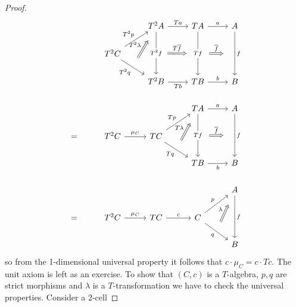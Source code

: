 \documentclass[a4paper,11pt,oneside,openany]{scrbook}
\begin{document}
\begin{proof}
    \[\begin{tikzcd}
        && {T^2A} & TA & A \\
        & {T^2C} \\
        && {T^2B} & TB & B \\
        &&& TA & A \\
        {=} & {T^2C} & TC \\
        &&& TB & B \\
        &&&& A \\
        {=} & {T^2C} & TC & C \\
        &&&& B
        \arrow[""{name=0, anchor=center, inner sep=0}, "{T^2q}"', from=2-2, to=3-3]
        \arrow["a", from=1-4, to=1-5]
        \arrow[""{name=1, anchor=center, inner sep=0}, "f", from=1-5, to=3-5]
        \arrow["Tb"', from=3-3, to=3-4]
        \arrow[""{name=2, anchor=center, inner sep=0}, "Tf"{description}, from=1-4, to=3-4]
        \arrow["b", from=3-4, to=3-5]
        \arrow[""{name=3, anchor=center, inner sep=0}, "{T^2f}"{description}, from=1-3, to=3-3]
        \arrow["Ta", from=1-3, to=1-4]
        \arrow["{T^2p}", from=2-2, to=1-3]
        \arrow[""{name=4, anchor=center, inner sep=0}, "f", from=4-5, to=6-5]
        \arrow["a", from=4-4, to=4-5]
        \arrow["b"', from=6-4, to=6-5]
        \arrow[""{name=5, anchor=center, inner sep=0}, "Tq"', from=5-3, to=6-4]
        \arrow["Tp", from=5-3, to=4-4]
        \arrow[""{name=6, anchor=center, inner sep=0}, "Tf"{description}, from=4-4, to=6-4]
        \arrow["{\mu_C}", from=5-2, to=5-3]
        \arrow["f", from=7-5, to=9-5]
        \arrow[""{name=7, anchor=center, inner sep=0}, "q"', from=8-4, to=9-5]
        \arrow["p", from=8-4, to=7-5]
        \arrow["c", from=8-3, to=8-4]
        \arrow["{\mu_C}", from=8-2, to=8-3]
        \arrow["{\overline{f}}", shorten <=13pt, shorten >=13pt, Rightarrow, from=2, to=1]
        \arrow["{T^2\lambda}", shorten <=12pt, shorten >=12pt, Rightarrow, from=0, to=1-3]
        \arrow["{T\overline{f}}", shorten <=13pt, shorten >=13pt, Rightarrow, from=3, to=2]
        \arrow["T\lambda", shorten <=12pt, shorten >=12pt, Rightarrow, from=5, to=4-4]
        \arrow["{\overline{f}}", shorten <=13pt, shorten >=13pt, Rightarrow, from=6, to=4]
        \arrow["\lambda", shorten <=12pt, shorten >=12pt, Rightarrow, from=7, to=7-5]
    \end{tikzcd}\]
    so from the 1-dimensional universal property it follows that
    $c\cdot\mu_C=c\cdot Tc$.
The unit axiom is left as an exercise. To show that $(C,c)$ is a $T$-algebra, $p,q$ are strict morphisms and $\lambda$ is a $T$-transformation we have to check the universal properties. Consider a $2$-cell 

\end{proof}
\end{document}
